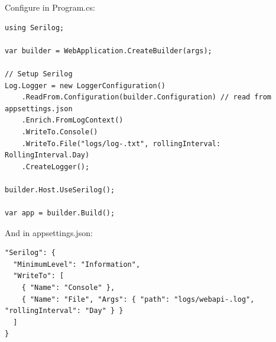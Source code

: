 Configure in Program.cs:

\begin{lstlisting}
using Serilog;

var builder = WebApplication.CreateBuilder(args);

// Setup Serilog
Log.Logger = new LoggerConfiguration()
    .ReadFrom.Configuration(builder.Configuration) // read from appsettings.json
    .Enrich.FromLogContext()
    .WriteTo.Console()
    .WriteTo.File("logs/log-.txt", rollingInterval: RollingInterval.Day)
    .CreateLogger();

builder.Host.UseSerilog();

var app = builder.Build();

\end{lstlisting}

And in appsettings.json:


\begin{lstlisting}
"Serilog": {
  "MinimumLevel": "Information",
  "WriteTo": [
    { "Name": "Console" },
    { "Name": "File", "Args": { "path": "logs/webapi-.log", "rollingInterval": "Day" } }
  ]
}

\end{lstlisting}


